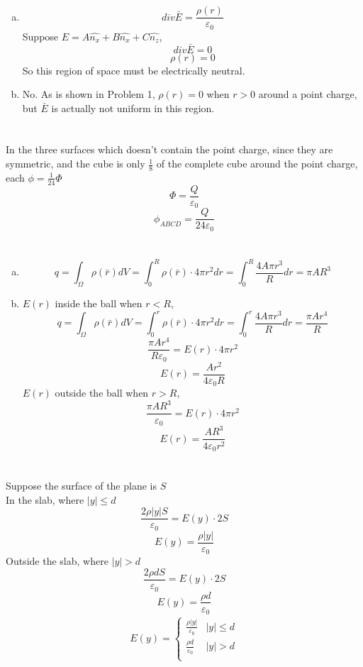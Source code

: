 \documentclass{article}
\begin{document}
\section{}
\begin{enumerate}[(a)]
\item
$$div\bar{E}=\frac{\rho(r)}{\varepsilon_0}$$
Suppose $E=A\hat{n_x}+B\hat{n_x}+C\hat{n_z}$,
$$div\bar{E}=0$$
$$\rho(r)=0$$
So this region of space must be electrically neutral.
\item
No. As is shown in Problem 1, $\rho(r)=0$ when $r>0$ around a point charge, but $\bar{E}$ is actually not uniform in this region.
\end{enumerate}

\section{}
In the three surfaces which doesn't contain the point charge, since they are symmetric, and the cube is only $\frac{1}{8}$ of the complete cube around the point charge, each $\phi=\frac{1}{24}\Phi$
$$\Phi=\frac{Q}{\varepsilon_0}$$
$$\phi_{ABCD}=\frac{Q}{24\varepsilon_0}$$

\section{}
\begin{enumerate}[(a)]
\item
$$q=\int_{\Omega}\rho(\bar{r})dV=\int_0^R\rho(\bar{r})\cdot4\pi r^2dr=\int_0^R\frac{4A\pi r^3}{R}dr=\pi AR^3$$
\item
$E(r)$ inside the ball when $r<R$,
$$q=\int_{\Omega}\rho(\bar{r})dV=\int_0^r\rho(\bar{r})\cdot4\pi r^2dr=\int_0^r\frac{4A\pi r^3}{R}dr=\frac{\pi Ar^4}{R}$$
$$\frac{\pi Ar^4}{R\varepsilon_0}=E(r)\cdot4\pi r^2$$
$$E(r)=\frac{Ar^2}{4\varepsilon_0R}$$
$E(r)$ outside the ball when $r>R$,
$$\frac{\pi AR^3}{\varepsilon_0}=E(r)\cdot4\pi r^2$$
$$E(r)=\frac{AR^3}{4\varepsilon_0r^2}$$
\end{enumerate}

\section{}
Suppose the surface of the plane is $S$\\
In the slab, where $|y|\leqslant d$
$$\frac{2\rho|y|S}{\varepsilon_0}=E(y)\cdot2S$$
$$E(y)=\frac{\rho|y|}{\varepsilon_0}$$
Outside the slab, where $|y|>d$
$$\frac{2\rho dS}{\varepsilon_0}=E(y)\cdot2S$$
$$E(y)=\frac{\rho d}{\varepsilon_0}$$
\begin{eqnarray*}
E(y)=\left\{
\begin{array}{ll}
\frac{\rho|y|}{\varepsilon_0} & |y|\leqslant d \\
\frac{\rho d}{\varepsilon_0}  & |y|>d \\
\end{array}
\right.
\end{eqnarray*}
\end{document}
